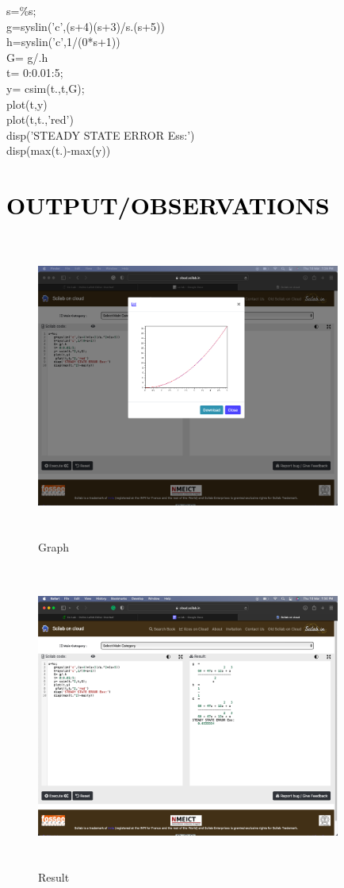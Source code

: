 \documentclass[12pt]{article}
\begin{document}
   s=\%s;\\ 
   g=syslin('c',(s+4)(s+3)/s.(s+5))\\
   h=syslin('c',1/(0*s+1))\\
   G= g/.h\\
   t= 0:0.01:5;\\
   y= csim(t.,t,G);\\
   plot(t,y)\\
    plot(t,t.,'red')\\
   disp('STEADY STATE ERROR Ess:')\\
   disp(max(t.)-max(y)) \par 

\section*{\textcolor{black}{OUTPUT/OBSERVATIONS}}

\begin{figure}[!hth]
        \centering
        \includegraphics[width =10cm, height = 10cm]{images/exp91.png}
        \caption{Graph}
        \label{Graph}
\end{figure}
\begin{figure}[!hth]
        \centering
        \includegraphics[width =10cm, height = 10cm]{images/exp92.png}
        \caption{Result}
        \label{Result}
\end{figure}
\end{document}

